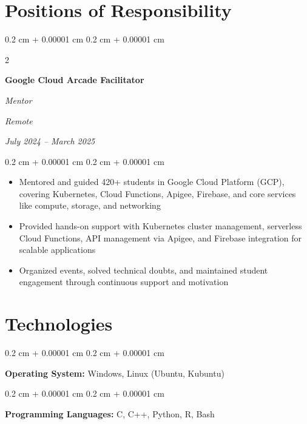 \documentclass[10pt, letterpaper]{article}
\newenvironment{highlights}{
    \begin{itemize}[
        topsep=0.10 cm,
        parsep=0.10 cm,
        partopsep=0pt,
        itemsep=0pt,
        leftmargin=0.4 cm + 10pt
    ]
}{
    \end{itemize}
} %
\newenvironment{onecolentry}{
    \begin{adjustwidth}{
        0.2 cm + 0.00001 cm
    }{
        0.2 cm + 0.00001 cm
    }
}{
    \end{adjustwidth}
} %
\newenvironment{twocolentry}[2][]{
    \onecolentry
    \def\secondColumn{#2}
    \setcolumnwidth{\fill, 4.5 cm}
    \begin{paracol}{2}
}{
    \switchcolumn \raggedleft \secondColumn
    \end{paracol}
    \endonecolentry
} %
\begin{document}
    \section{Positions of Responsibility}


        \begin{twocolentry}{
        \textit{Remote}
        
        \textit{July 2024 – March 2025}}
            \textbf{Google Cloud Arcade Facilitator}
            
            \textit{Mentor}
        \end{twocolentry}

        \vspace{0.10 cm}
        \begin{onecolentry}
            \begin{highlights}
                \item Mentored and guided 420+ students in Google Cloud Platform (GCP), covering Kubernetes, Cloud Functions, Apigee, Firebase, and core services like compute, storage, and networking
                \item Provided hands-on support with Kubernetes cluster management, serverless Cloud Functions, API management via Apigee, and Firebase integration for scalable applications
                \item Organized events, solved technical doubts, and maintained student engagement through continuous support and motivation
            \end{highlights}
        \end{onecolentry}

        \vspace{0.2 cm}



    \section{Technologies}


        \begin{onecolentry}
            \textbf{Operating System:} Windows, Linux (Ubuntu, Kubuntu)
        \end{onecolentry}

        \vspace{0.2 cm}

        \begin{onecolentry}
            \textbf{Programming Languages:} C, C++, Python, R, Bash
        \end{onecolentry}
\end{document}
